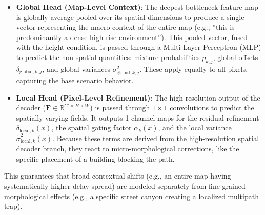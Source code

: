 \documentclass[11pt,a4paper]{article}
\begin{document}
\begin{itemize}
\item \textbf{Global Head (Map-Level Context)}: The deepest bottleneck feature map is globally average-pooled over its spatial dimensions to produce a single vector representing the macro-context of the entire map (e.g., ''this is predominantly a dense high-rise environment''). This pooled vector, fused with the height condition, is passed through a Multi-Layer Perceptron (MLP) to predict the non-spatial quantities: mixture probabilities $p_{k,j}$, global offsets $\delta_{\mathrm{global},k,j}$, and global variances $\sigma_{\mathrm{global},k,j}^2$. These apply equally to all pixels, capturing the base scenario behavior.

\item \textbf{Local Head (Pixel-Level Refinement)}: The high-resolution output of the decoder ($\mathbf{F} \in \mathbb{R}^{C' \times H \times W}$) is passed through $1\times1$ convolutions to predict the spatially varying fields. It outputs 1-channel maps for the residual refinement $\delta_{\mathrm{local},k}(x)$, the spatial gating factor $\alpha_k(x)$, and the local variance $\tilde\sigma_{\mathrm{local},k}^2(x)$. Because these terms are derived from the high-resolution spatial decoder branch, they react to micro-morphological corrections, like the specific placement of a building blocking the path.
\end{itemize}

This guarantees that broad contextual shifts (e.g., an entire map having systematically higher delay spread) are modeled separately from fine-grained morphological effects (e.g., a specific street canyon creating a localized multipath trap).
\end{document}
